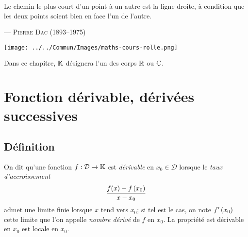 \documentclass{magnolia}
\begin{document}
\setlength{}
\epigraph{\og Le chemin le plus court d'un point à un autre est la ligne droite, à condition que les deux points soient bien en face l'un de l'autre.\fg}{--- \textsc{Pierre Dac (1893--1975)}}
\bigskip
\hfill\texttt{[image: ../../Commun/Images/maths-cours-rolle.png]}

\magtoc
\vspace{2ex}
Dans ce chapitre, $\mathbb{K}$ désignera l'un des corps $\mathbb{R}$ ou $\mathbb{C}$.

\section{Fonction dérivable, dérivées successives}
\subsection{Définition}

\begin{definition}[utile=-3]
On dit qu'une fonction $f:\mathcal{D}\to\mathbb{K}$ est \emph{dérivable} en $x_0\in\mathcal{D}$ lorsque le
\emph{taux d'accroissement}
\[\frac{f(x)-f\left(x_0\right)}{x-x_0}\]
admet une limite finie lorsque $x$ tend vers $x_0$; si tel est le cas, on note
$f'\left(x_0\right)$ cette limite que l'on appelle \emph{nombre dérivé} de $f$ en $x_0$.
La propriété \og est dérivable en $x_0$ \fg est locale en $x_0$.
\end{definition}

\end{document}
